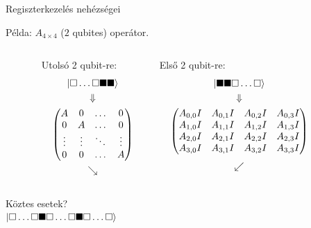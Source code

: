\documentclass[aspectratio=169]{beamer}
\begin{document}
\begin{frame}{Regiszterkezelés nehézségei}

Példa: $A_{4\times{}4}$ ($2$ qubites) operátor.
\vspace{0.5cm}
\begin{columns}
  \begin{column}[t]{0.2\textwidth}
  \end{column}
  \begin{column}[t]{0.3\textwidth}
    \centering
    Utolsó 2 qubit-re:
    \begin{gather*}
      \ket{\square{}\dots{}\square{}\blacksquare{}\blacksquare{}} \\
      \Downarrow  \\
      \begin{pmatrix}
        A & 0  & \dots{} & 0 \\
       0 & A  & \dots{} & 0 \\ 
       \vdots{} & \vdots{}  & \ddots{} & \vdots{} \\
       0 & 0  & \dots{} & A \\
     \end{pmatrix} \\
     \searrow
    \end{gather*}
  \end{column}
  \begin{column}[t]{0.3\textwidth}
    \centering
    Első 2 qubit-re:
    \begin{gather*}
      \ket{\blacksquare{}\blacksquare{}\square{}\dots{}\square{}} \\
      \Downarrow \\
      \begin{pmatrix}
        A_{0,0} I & A_{0,1} I & A_{0,2} I & A_{0,3} I  \\
        A_{1,0} I & A_{1,1} I & A_{1,2} I & A_{1,3} I \\
        A_{2,0} I & A_{2,1} I & A_{2,2} I & A_{2,3} I \\
        A_{3,0} I & A_{3,1} I & A_{3,2} I & A_{3,3} I \\
      \end{pmatrix}\\[3pt]
     \swarrow
    \end{gather*}
  \end{column}
  \begin{column}[t]{0.2\textwidth}
  \end{column}
  \end{columns}

\begin{center}
  Köztes esetek?\\
  $\ket{\square{}\dots{}\square{}\blacksquare{}\square{}\dots{}\square{}\blacksquare{}\square{}\dots{}\square{}} $
\end{center}

\end{frame}
\end{document}

